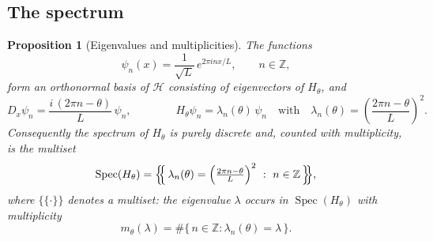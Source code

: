 \documentclass[11pt,reqno]{amsart}
\theoremstyle{plain}
\newtheorem{proposition}[theorem]{Proposition}
\theoremstyle{definition}
\newcommand{\Zz}{\mathbb{Z}}
\newcommand{\Spec}{\operatorname{Spec}}
\newcommand{\Dx}{D_{x}}
\begin{document}
\subsection{The spectrum}

\begin{proposition}[Eigenvalues and multiplicities]\label{prop:spectrum}
The functions
\begin{equation}\label{eq:psin}
\psi_n(x)=\frac{1}{\sqrt{L}}\,e^{2\pi i n x/L},
\qquad n\in\Zz,
\end{equation}
form an orthonormal basis of $\mathcal{H}$ consisting of eigenvectors of $H_\theta$, and
\begin{equation}\label{eq:Dpsin}
\Dx\psi_n=\frac{i\,(2\pi n-\theta)}{L}\,\psi_n,
\qquad\qquad
H_\theta\psi_n=\lambda_n(\theta)\,\psi_n
\quad\text{with}\quad
\lambda_n(\theta)=\left(\frac{2\pi n-\theta}{L}\right)^{\!2}.
\end{equation}
Consequently the spectrum of $H_\theta$ is purely discrete and, \emph{counted with multiplicity},
is the multiset
\begin{equation}\label{eq:spec}
\Spec(H_\theta)=\Bigl\{\!\!\Bigl\{\,\lambda_n(\theta)=\Bigl(\tfrac{2\pi n-\theta}{L}\Bigr)^{2}
\ :\ n\in\Zz \,\Bigr\}\!\!\Bigr\},
\end{equation}
where $\{\!\{\cdot\}\!\}$ denotes a multiset: the eigenvalue $\lambda$ occurs in
$\Spec(H_\theta)$ with multiplicity
\begin{equation}\label{eq:multiplicity}
m_\theta(\lambda)=\#\bigl\{\, n\in\Zz : \lambda_n(\theta)=\lambda \,\bigr\}.
\end{equation}
\end{proposition}
\end{document}
